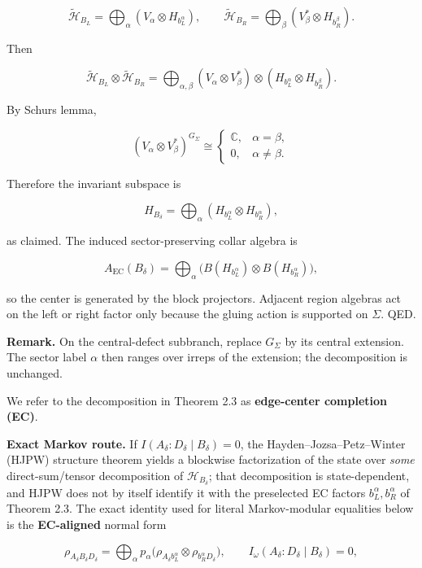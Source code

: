 \[
\tilde{\mathcal H}_{B_L} = \bigoplus_\alpha (V_\alpha \otimes H_{b_L^\alpha}),\qquad
\tilde{\mathcal H}_{B_R} = \bigoplus_\beta (V_\beta^* \otimes H_{b_R^\beta}).
\]

Then

\[
\tilde{\mathcal H}_{B_L} \otimes \tilde{\mathcal H}_{B_R}
= \bigoplus_{\alpha,\beta}
(V_\alpha \otimes V_\beta^*) \otimes
(H_{b_L^\alpha} \otimes H_{b_R^\beta}).
\]

By Schur\textquotesingle s lemma,

\[
(V_\alpha \otimes V_\beta^*)^{G_\Sigma}
\cong
\begin{cases}
\mathbb C, & \alpha=\beta,\\
0, & \alpha\ne\beta.
\end{cases}
\]

Therefore the invariant subspace is

\[
H_{B_\delta} = \bigoplus_\alpha (H_{b_L^\alpha} \otimes H_{b_R^\alpha}),
\]

as claimed. The induced sector-preserving collar algebra is

\[
A_{\mathrm{EC}}(B_\delta) = \bigoplus_\alpha
\bigl(B(H_{b_L^\alpha}) \otimes B(H_{b_R^\alpha})\bigr),
\]

so the center is generated by the block projectors. Adjacent region algebras act on the left or right factor only because the gluing action is supported on \(\Sigma\). QED.

\textbf{Remark.} On the central-defect subbranch, replace \(G_\Sigma\) by its central extension. The sector label \(\alpha\) then ranges over irreps of the extension; the decomposition is unchanged.

We refer to the decomposition in Theorem 2.3 as \textbf{edge-center completion (EC)}.

\textbf{Exact Markov route.} If \(I(A_\delta:D_\delta\mid B_\delta)=0\), the Hayden--Jozsa--Petz--Winter (HJPW) structure theorem yields a blockwise factorization of the state over \emph{some} direct-sum/tensor decomposition of \(\mathcal H_{B_\delta}\); that decomposition is state-dependent, and HJPW does not by itself identify it with the preselected EC factors \(b_L^\alpha,b_R^\alpha\) of Theorem 2.3. The exact identity used for literal Markov-modular equalities below is the \textbf{EC-aligned} normal form

\[
\rho_{A_\delta B_\delta D_\delta}
= \bigoplus_\alpha p_\alpha
\bigl(\rho_{A_\delta b_L^\alpha} \otimes \rho_{b_R^\alpha D_\delta}\bigr),
\qquad
I_\omega(A_\delta:D_\delta \mid B_\delta)=0,
\]

